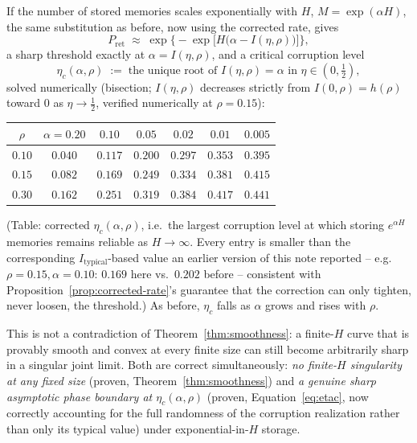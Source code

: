 \documentclass[11pt]{article}
\newcommand{\toprule}{\hline\hline}
\newcommand{\midrule}{\hline}
\newcommand{\bottomrule}{\hline\hline}
\begin{document}
If the number of stored memories scales exponentially with $H$, $M=\exp(\alpha H)$, the same
substitution as before, now using the corrected rate, gives
\begin{equation}
P_{\mathrm{ret}} \;\approx\; \exp\Big\{-\exp\big[H\big(\alpha-I(\eta,\rho)\big)\big]\Big\},
\label{eq:doubleexp}
\end{equation}
a sharp threshold exactly at $\alpha=I(\eta,\rho)$, and a critical corruption level
\begin{equation}
\eta_c(\alpha,\rho) \;:=\; \text{the unique root of } I(\eta,\rho)=\alpha \text{ in } \eta \in (0,\tfrac12),
\label{eq:etac}
\end{equation}
solved numerically (bisection; $I(\eta,\rho)$ decreases strictly from $I(0,\rho)=h(\rho)$ toward
$0$ as $\eta\to\tfrac12$, verified numerically at $\rho{=}0.15$):

\begin{center}
\begin{tabular}{ccccccc}
\toprule
$\rho$ & $\alpha{=}0.20$ & $0.10$ & $0.05$ & $0.02$ & $0.01$ & $0.005$ \\
\midrule
$0.10$ & $0.040$ & $0.117$ & $0.200$ & $0.297$ & $0.353$ & $0.395$ \\
$0.15$ & $0.082$ & $0.169$ & $0.249$ & $0.334$ & $0.381$ & $0.415$ \\
$0.30$ & $0.162$ & $0.251$ & $0.319$ & $0.384$ & $0.417$ & $0.441$ \\
\bottomrule
\end{tabular}
\end{center}
\noindent(Table: corrected $\eta_c(\alpha,\rho)$, i.e.\ the largest corruption level at which
storing $e^{\alpha H}$ memories remains reliable as $H\to\infty$. Every entry is smaller than the
corresponding $I_{\mathrm{typical}}$-based value an earlier version of this note reported --
e.g.\ $\rho{=}0.15,\alpha{=}0.10$: $0.169$ here vs.\ $0.202$ before -- consistent with
Proposition~\ref{prop:corrected-rate}'s guarantee that the correction can only tighten, never
loosen, the threshold.) As before, $\eta_c$ falls as $\alpha$ grows and rises with $\rho$.

This is not a contradiction of Theorem~\ref{thm:smoothness}: a finite-$H$ curve that is provably
smooth and convex at every finite size can still become arbitrarily sharp in a singular joint
limit. Both are correct simultaneously: \emph{no finite-$H$ singularity at any fixed size}
(proven, Theorem~\ref{thm:smoothness}) and \emph{a genuine sharp asymptotic phase boundary at
$\eta_c(\alpha,\rho)$} (proven, Equation~\ref{eq:etac}, now correctly accounting for the full
randomness of the corruption realization rather than only its typical value) under
exponential-in-$H$ storage.
\end{document}
